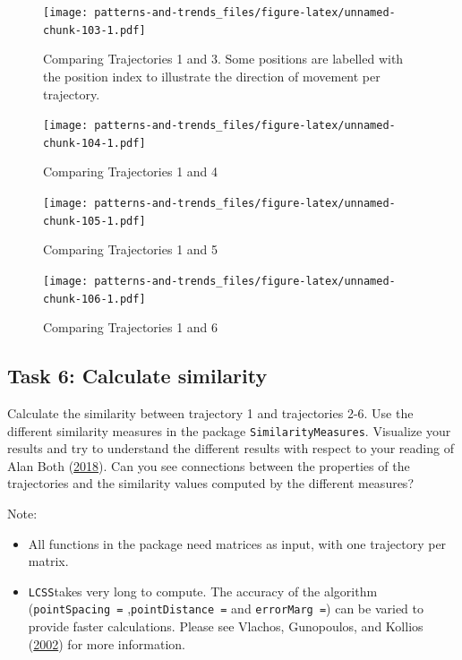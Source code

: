 \documentclass[]{book}
\providecommand{\tightlist}{%
  \setlength{\itemsep}{0pt}\setlength{\parskip}{0pt}}
\begin{document}
\begin{figure}
\centering
\texttt{[image: patterns-and-trends\_files/figure-latex/unnamed-chunk-103-1.pdf]}
\caption{\label{fig:unnamed-chunk-103}Comparing Trajectories 1 and 3. Some positions are labelled with the position index to illustrate the direction of movement per trajectory.}
\end{figure}

\begin{figure}
\centering
\texttt{[image: patterns-and-trends\_files/figure-latex/unnamed-chunk-104-1.pdf]}
\caption{\label{fig:unnamed-chunk-104}Comparing Trajectories 1 and 4}
\end{figure}

\begin{figure}
\centering
\texttt{[image: patterns-and-trends\_files/figure-latex/unnamed-chunk-105-1.pdf]}
\caption{\label{fig:unnamed-chunk-105}Comparing Trajectories 1 and 5}
\end{figure}

\begin{figure}
\centering
\texttt{[image: patterns-and-trends\_files/figure-latex/unnamed-chunk-106-1.pdf]}
\caption{\label{fig:unnamed-chunk-106}Comparing Trajectories 1 and 6}
\end{figure}

\hypertarget{task-6-calculate-similarity}{%
\subsection{Task 6: Calculate similarity}\label{task-6-calculate-similarity}}

Calculate the similarity between trajectory 1 and trajectories 2-6. Use the different similarity measures in the package \texttt{SimilarityMeasures}. Visualize your results and try to understand the different results with respect to your reading of Alan Both (\protect\hyperlink{ref-both2018}{2018}). Can you see connections between the properties of the trajectories and the similarity values computed by the different measures?

Note:

\begin{itemize}
\tightlist
\item
  All functions in the package need matrices as input, with one trajectory per matrix.
\item
  \texttt{LCSS}takes very long to compute. The accuracy of the algorithm (\texttt{pointSpacing\ =} ,\texttt{pointDistance\ =} and \texttt{errorMarg\ =}) can be varied to provide faster calculations. Please see Vlachos, Gunopoulos, and Kollios (\protect\hyperlink{ref-vlachos2002}{2002}) for more information.
\end{itemize}
\end{document}
